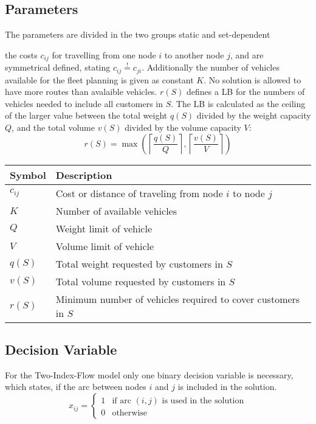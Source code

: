 \subsection*{Parameters}
The parameters are divided in the two groups static and set-dependent

the costs $c_{ij}$ for travelling from one node $i$ to another node $j$, and
are symmetrical defined, stating $c_{ij} \overset{!}{=} c_{ji}$. Additionally the number of vehicles
available for the fleet planning is given as constant $K$. No solution is allowed to have
more routes than avalaible vehicles. $r(S)$ defines a \gls{LB} for the numbers of vehicles needed
to include all customers in $S$. The \gls{LB} is calculated as the ceiling of the larger
value between the total weight $q(S)$ divided by the weight capacity $Q$, and the
total volume $v(S)$ divided by the volume capacity $V$:
\[r(S) = \max\left( \left\lceil \frac{q(S)}{Q} \right\rceil, \left\lceil \frac{v(S)}{V} \right\rceil \right)\]

\begin{table}[ht]
    \centering
    \begin{tabular}{ll}
        \toprule
        Symbol   & Description                                                   \\
        \midrule
        $c_{ij}$ & Cost or distance of traveling from node $i$ to node $j$       \\
        $K$      & Number of available vehicles                                  \\
        $Q$      & Weight limit of vehicle                                       \\
        $V$      & Volume limit of vehicle                                       \\
        $q(S)$   & Total weight requested by customers in $S$                    \\
        $v(S)$   & Total volume requested by customers in $S$                    \\
        $r(S)$   & Minimum number of vehicles required to cover customers in $S$ \\
        \bottomrule
    \end{tabular}
\end{table}

\bigskip

\subsection*{Decision Variable}
For the Two-Index-Flow model only one binary decision variable is necessary, which states, if the arc
between nodes $i$ and $j$ is included in the solution.
\[
    x_{ij} =
    \begin{cases}
        1 & \text{if arc } (i,j) \text{ is used in the solution} \\
        0 & \text{otherwise}
    \end{cases}
\]


